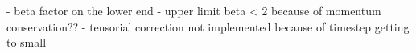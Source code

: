 - beta factor on the lower end
- upper limit beta < 2 because of momentum conservation??
- tensorial correction not implemented because of timestep getting to small